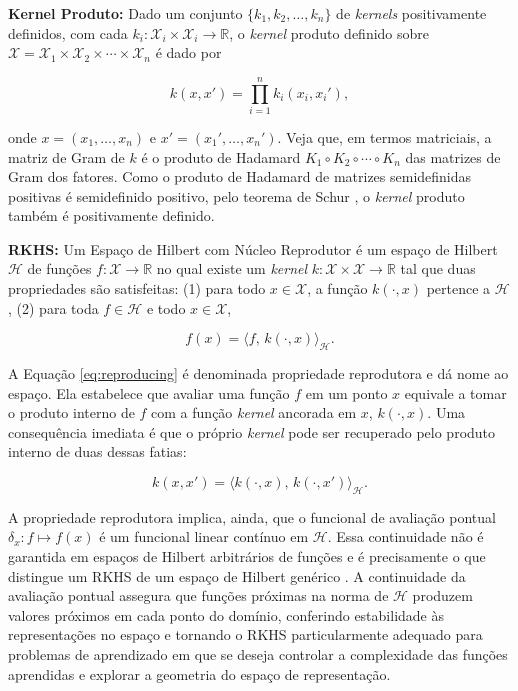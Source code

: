 \textbf{Kernel Produto:} Dado um conjunto $\{k_1, k_2, \dots, k_n\}$ de \textit{kernels} positivamente definidos, com cada $k_i: \mathcal{X}_i \times \mathcal{X}_i \to \mathbb{R}$, o \textit{kernel} produto definido sobre $\mathcal{X} = \mathcal{X}_1 \times \mathcal{X}_2 \times \cdots \times \mathcal{X}_n$ é dado por

\begin{equation}\label{eq:kernel_prod}
    k(x, x') = \prod_{i=1}^{n} k_i(x_i, x_i'),
\end{equation}

\noindent onde $x = (x_1, \dots, x_n)$ e $x' = (x_1', \dots, x_n')$. Veja que, em termos matriciais, a matriz de Gram de $k$ é o produto de Hadamard $K_1 \circ K_2 \circ \cdots \circ K_n$ das matrizes de Gram dos fatores. Como o produto de Hadamard de matrizes semidefinidas positivas é semidefinido positivo, pelo teorema de Schur \citep{Schur1911, HornJohnson2013}, o \textit{kernel} produto também é positivamente definido.

\textbf{RKHS:} Um Espaço de Hilbert com Núcleo Reprodutor é um espaço de Hilbert $\mathcal{H}$ de funções $f: \mathcal{X} \to \mathbb{R}$ no qual existe um \textit{kernel} $k: \mathcal{X} \times \mathcal{X} \to \mathbb{R}$ tal que duas propriedades são satisfeitas: (1) para todo $x \in \mathcal{X}$, a função $k(\cdot, x)$ pertence a $\mathcal{H}$, (2) para toda $f \in \mathcal{H}$ e todo $x \in \mathcal{X}$,

\begin{equation}\label{eq:reproducing}
    f(x) = \langle f, \, k(\cdot, x) \rangle_{\mathcal{H}}.
\end{equation}

A Equação \eqref{eq:reproducing} é denominada propriedade reprodutora e dá nome ao espaço. Ela estabelece que avaliar uma função $f$ em um ponto $x$ equivale a tomar o produto interno de $f$ com a função \textit{kernel} ancorada em $x$, $k(\cdot, x)$. Uma consequência imediata é que o próprio \textit{kernel} pode ser recuperado pelo produto interno de duas dessas fatias:

\begin{equation}\label{eq:kernel_inner}
    k(x, x') = \langle k(\cdot, x), \, k(\cdot, x') \rangle_{\mathcal{H}}.
\end{equation}

A propriedade reprodutora implica, ainda, que o funcional de avaliação pontual $\delta_x: f \mapsto f(x)$ é um funcional linear contínuo em $\mathcal{H}$. Essa continuidade não é garantida em espaços de Hilbert arbitrários de funções e é precisamente o que distingue um RKHS de um espaço de Hilbert genérico \citep{Aronszajn1950}. A continuidade da avaliação pontual assegura que funções próximas na norma de $\mathcal{H}$ produzem valores próximos em cada ponto do domínio, conferindo estabilidade às representações no espaço e tornando o RKHS particularmente adequado para problemas de aprendizado em que se deseja controlar a complexidade das funções aprendidas e explorar a geometria do espaço de representação.

